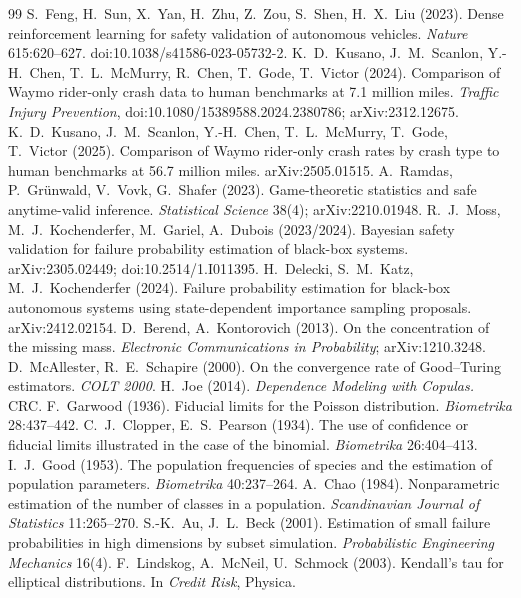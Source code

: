 \documentclass[11pt,a4paper]{article}
\begin{document}
\begin{thebibliography}{99}
 S.~Feng, H.~Sun, X.~Yan, H.~Zhu, Z.~Zou, S.~Shen, H.~X.~Liu (2023). Dense reinforcement learning for safety validation of autonomous vehicles. \emph{Nature} 615:620--627. doi:10.1038/s41586-023-05732-2.
 K.~D.~Kusano, J.~M.~Scanlon, Y.-H.~Chen, T.~L.~McMurry, R.~Chen, T.~Gode, T.~Victor (2024). Comparison of Waymo rider-only crash data to human benchmarks at 7.1 million miles. \emph{Traffic Injury Prevention}, doi:10.1080/15389588.2024.2380786; arXiv:2312.12675.
 K.~D.~Kusano, J.~M.~Scanlon, Y.-H.~Chen, T.~L.~McMurry, T.~Gode, T.~Victor (2025). Comparison of Waymo rider-only crash rates by crash type to human benchmarks at 56.7 million miles. arXiv:2505.01515.
 A.~Ramdas, P.~Grünwald, V.~Vovk, G.~Shafer (2023). Game-theoretic statistics and safe anytime-valid inference. \emph{Statistical Science} 38(4); arXiv:2210.01948.
 R.~J.~Moss, M.~J.~Kochenderfer, M.~Gariel, A.~Dubois (2023/2024). Bayesian safety validation for failure probability estimation of black-box systems. arXiv:2305.02449; doi:10.2514/1.I011395.
 H.~Delecki, S.~M.~Katz, M.~J.~Kochenderfer (2024). Failure probability estimation for black-box autonomous systems using state-dependent importance sampling proposals. arXiv:2412.02154.
 D.~Berend, A.~Kontorovich (2013). On the concentration of the missing mass. \emph{Electronic Communications in Probability}; arXiv:1210.3248.
 D.~McAllester, R.~E.~Schapire (2000). On the convergence rate of Good--Turing estimators. \emph{COLT 2000}.
 H.~Joe (2014). \emph{Dependence Modeling with Copulas.} CRC.
 F.~Garwood (1936). Fiducial limits for the Poisson distribution. \emph{Biometrika} 28:437--442.
 C.~J.~Clopper, E.~S.~Pearson (1934). The use of confidence or fiducial limits illustrated in the case of the binomial. \emph{Biometrika} 26:404--413.
 I.~J.~Good (1953). The population frequencies of species and the estimation of population parameters. \emph{Biometrika} 40:237--264.
 A.~Chao (1984). Nonparametric estimation of the number of classes in a population. \emph{Scandinavian Journal of Statistics} 11:265--270.
 S.-K.~Au, J.~L.~Beck (2001). Estimation of small failure probabilities in high dimensions by subset simulation. \emph{Probabilistic Engineering Mechanics} 16(4).
 F.~Lindskog, A.~McNeil, U.~Schmock (2003). Kendall's tau for elliptical distributions. In \emph{Credit Risk}, Physica.

\end{thebibliography}
\end{document}
